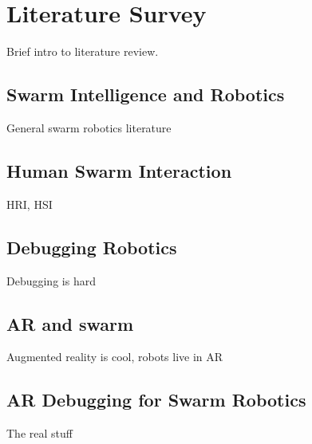 
\chapter[Literature Survey]{Literature Survey} %

\label{Chapter2} %





Brief intro to literature review.


\section{Swarm Intelligence and Robotics}
General swarm robotics literature


\section{Human Swarm Interaction}
HRI, HSI


\section{Debugging Robotics}
Debugging is hard


\section{AR and swarm}
Augmented reality is cool, robots live in AR

\section{AR Debugging for Swarm Robotics}
The real stuff
